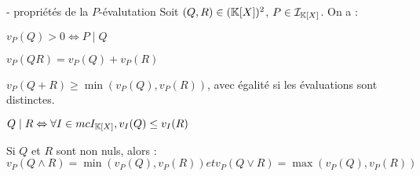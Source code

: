 


\begin{theoreme}{16.105}{ - propriétés de la $P$-évalutation}
    Soit $(Q,R) \in (\mathbb{K}[X])^2$, $P \in \mathcal{I}_{\mathbb{K}[X]}$. On a :
    \begin{enumeratebf}
        \item $v_P(Q) > 0 \Leftrightarrow P \mid Q$
        \item $v_P(QR) = v_P(Q) + v_P(R)$
        \item $v_P(Q + R) \geq \min(v_P(Q),v_P(R))$, avec égalité si les évaluations sont distinctes.
        \item $Q \mid R \Leftrightarrow \forall I \in mc{I}_{\mathbb{K}[X]}, v_I(Q) \leq v_I(R)$
        \item Si $Q$ et $R$ sont non nuls, alors : $$v_P(Q \wedge R) = \min(v_P(Q),v_P(R)) et v_P(Q \vee R) = \max(v_P(Q),v_P(R))$$
    \end{enumeratebf}
\end{theoreme}

